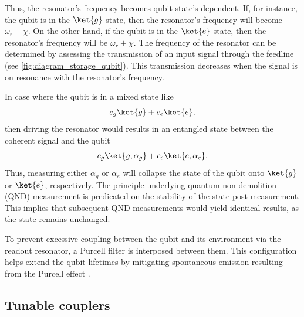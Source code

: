 Thus, the resonator's frequency becomes qubit-state's dependent.
If, for instance, the qubit is in the $\ket{g}$ state, then the resonator's frequency will become $\omega_r - \chi$.
On the other hand, if the qubit is in the $\ket{e}$ state, then the resonator's frequency will be $\omega_r + \chi$.
The frequency of the resonator can be determined by assessing the transmission of an input signal through the feedline (see \cref{fig:diagram_storage_qubit}).
This transmission decreases when the signal is on resonance with the resonator's frequency.

In case where the qubit is in a mixed state like
\begin{equation}
    c_g \ket{g} + c_e \ket{e} ,
\end{equation}
then driving the resonator would results in an entangled state between the coherent signal and the qubit
\begin{equation}
    c_g \ket{g, \alpha_g} + c_e \ket{e, \alpha_e} .
\end{equation}
Thus, measuring either $\alpha_g$ or $\alpha_e$ will collapse the state of the qubit onto $\ket{g}$ or $\ket{e}$, respectively.
The principle underlying quantum non-demolition (QND) measurement is predicated on the stability of the state post-measurement.
This implies that subsequent QND measurements would yield identical results, as the state remains unchanged.

To prevent excessive coupling between the qubit and its environment via the readout resonator, a Purcell filter is interposed between them.
This configuration helps extend the qubit lifetimes by mitigating spontaneous emission resulting from the Purcell effect \cite{Purcell_effect}.

\subsection{Tunable couplers}

